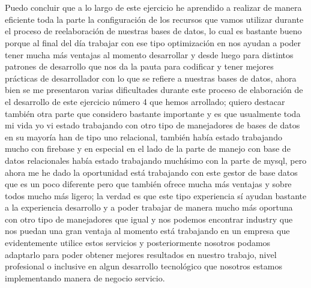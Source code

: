 \documentclass[10pt,a4paper]{article}
\begin{document}
\section{\color{colorIPN}{Conclusión}}
\vspace{5mm}
Puedo concluir que a lo largo de este ejercicio he aprendido a realizar de manera eficiente toda la parte la configuración de los recursos que vamos utilizar durante el proceso de reelaboración de nuestras bases de datos, lo cual es bastante bueno porque al final del día trabajar con ese tipo optimización en nos ayudan a poder tener mucha más ventajas al momento desarrollar y desde luego para distintos patrones de desarrollo que nos da la pauta para codificar y tener mejores prácticas de desarrollador con lo que se refiere a nuestras bases de datos, ahora bien se me presentaron varias dificultades durante este proceso de elaboración de el desarrollo de este ejercicio número 4 que hemos arrollado; quiero destacar también otra parte que considero bastante importante y es que usualmente toda mi vida yo vi estado trabajando con otro tipo de manejadores de bases de datos en su mayoría han de tipo uno relacional, también había estado trabajando mucho con firebase y en especial en el lado de la parte de manejo con base de datos relacionales había estado trabajando muchísimo con la parte de mysql, pero ahora me he dado la oportunidad está trabajando con este gestor de base datos que es un poco diferente pero que también ofrece mucha más ventajas y sobre todos mucho más ligero; la verdad es que este tipo experiencia sí ayudan bastante a la experiencia desarrollo y a poder trabajar de manera mucho más oportuna con otro tipo de manejadores que igual y nos podemos encontrar industry que nos puedan una gran ventaja al momento está trabajando en un empresa que evidentemente utilice estos servicios y posteriormente nosotros podamos adaptarlo para poder obtener mejores resultados en nuestro trabajo, nivel profesional o inclusive en algun desarrollo tecnológico que nosotros estamos implementando manera de negocio servicio.


\pagebreak


\section{\color{colorIPN}{Referencias Bibliográficas}}

\pagebreak
\end{document}
